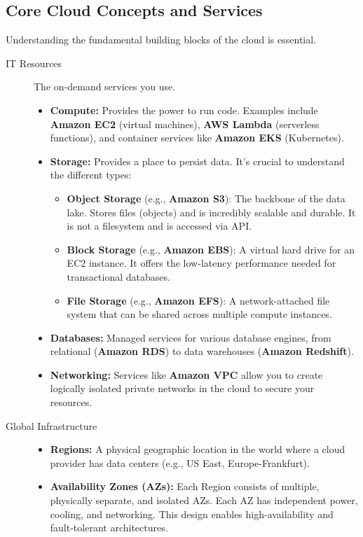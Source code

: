 \documentclass{article}
\begin{document}
\subsection{Core Cloud Concepts and Services}
Understanding the fundamental building blocks of the cloud is essential.
\begin{description}
    \item[IT Resources] The on-demand services you use.
        \begin{itemize}
            \item \textbf{Compute:} Provides the power to run code. Examples include \textbf{Amazon EC2} (virtual machines), \textbf{AWS Lambda} (serverless functions), and container services like \textbf{Amazon EKS} (Kubernetes).
            \item \textbf{Storage:} Provides a place to persist data. It's crucial to understand the different types:
                \begin{itemize}
                    \item \textbf{Object Storage} (e.g., \textbf{Amazon S3}): The backbone of the data lake. Stores files (objects) and is incredibly scalable and durable. It is not a filesystem and is accessed via API.
                    \item \textbf{Block Storage} (e.g., \textbf{Amazon EBS}): A virtual hard drive for an EC2 instance. It offers the low-latency performance needed for transactional databases.
                    \item \textbf{File Storage} (e.g., \textbf{Amazon EFS}): A network-attached file system that can be shared across multiple compute instances.
                \end{itemize}
            \item \textbf{Databases:} Managed services for various database engines, from relational (\textbf{Amazon RDS}) to data warehouses (\textbf{Amazon Redshift}).
            \item \textbf{Networking:} Services like \textbf{Amazon VPC} allow you to create logically isolated private networks in the cloud to secure your resources.
        \end{itemize}
    \item[Global Infrastructure]
        \begin{itemize}
            \item \textbf{Regions:} A physical geographic location in the world where a cloud provider has data centers (e.g., US East, Europe-Frankfurt).
            \item \textbf{Availability Zones (AZs):} Each Region consists of multiple, physically separate, and isolated AZs. Each AZ has independent power, cooling, and networking. This design enables high-availability and fault-tolerant architectures.
        \end{itemize}
\end{description}
\end{document}
